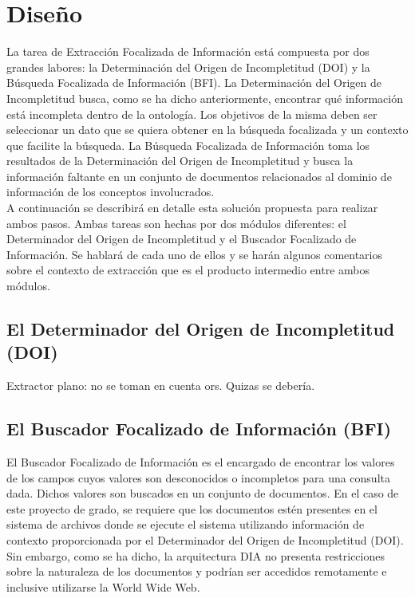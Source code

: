 \chapter{Diseño} \label{chap:diseno}

La tarea de Extracción Focalizada de Información está compuesta por dos grandes labores: la Determinación del Origen de Incompletitud (DOI) y la Búsqueda Focalizada de Información (BFI). La Determinación del Origen de Incompletitud busca, como se ha dicho anteriormente, encontrar qué información está incompleta dentro de la ontología. Los objetivos de la misma deben ser seleccionar un dato que se quiera obtener en la búsqueda focalizada y un contexto que facilite la búsqueda.  La Búsqueda Focalizada de Información toma los resultados de la Determinación del Origen de Incompletitud y busca la información faltante en un conjunto de documentos relacionados al dominio de información de los conceptos involucrados. \\

A continuación se describirá en detalle esta solución propuesta para realizar ambos pasos. Ambas tareas son hechas por dos módulos diferentes: el Determinador del Origen de Incompletitud y el Buscador Focalizado de Información. Se hablará de cada uno de ellos y se harán algunos comentarios sobre el contexto de extracción que es el producto intermedio entre ambos módulos. 

\section{El Determinador del Origen de Incompletitud (DOI)}\label{sect:diseno-DOI}

Extractor plano: no se toman en cuenta ors. Quizas se debería.

\section{El Buscador Focalizado de Información (BFI)}\label{sect:diseno-BFI}

El Buscador Focalizado de Información es el encargado de encontrar los valores de los campos cuyos valores son desconocidos o incompletos para una consulta dada. Dichos valores son buscados en un conjunto de documentos. En el caso de este proyecto de grado, se requiere que los documentos estén presentes en el sistema de archivos donde se ejecute el sistema utilizando información de contexto proporcionada por el Determinador del Origen de Incompletitud (DOI). Sin embargo, como se ha dicho, la arquitectura DIA no presenta restricciones sobre la naturaleza de los documentos y podrían ser accedidos remotamente e inclusive utilizarse la World Wide Web.\\

